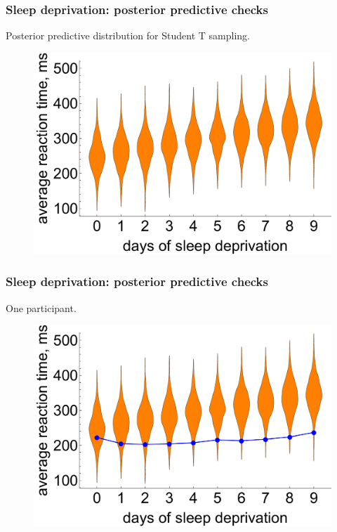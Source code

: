 \documentclass[handout]{beamer}
\begin{document}
\begin{frame}
	\frametitle{Sleep deprivation: posterior predictive checks}
	Posterior predictive distribution for Student T sampling.
	
	\begin{figure}[ht]
		\centerline{\includegraphics[width=1\textwidth]{./Figures/lec6_sleepPPC1.pdf}}
	\end{figure}
	
\end{frame}

\begin{frame}
	\frametitle{Sleep deprivation: posterior predictive checks}
	One participant.
	
	\begin{figure}[ht]
		\centerline{\includegraphics[width=1\textwidth]{./Figures/lec6_sleepPPC2.pdf}}
	\end{figure}
	
\end{frame}
\end{document}
